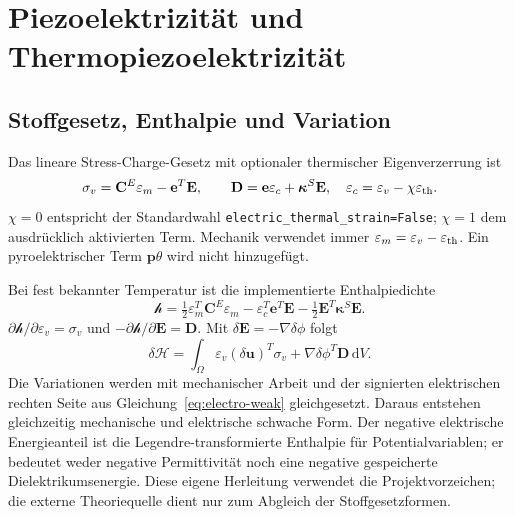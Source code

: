 \chapter{Piezoelektrizität und Thermopiezoelektrizität}\label{chap:coupling}
\section{Stoffgesetz, Enthalpie und Variation}
Das lineare Stress-Charge-Gesetz mit optionaler thermischer Eigenverzerrung ist
\begin{equation}\label{eq:piezo-law}
\sigma_v=\mathbf C^E\varepsilon_m-\mathbf e^T\mathbf E,\qquad
\mathbf D=\mathbf e\varepsilon_c+\boldsymbol\kappa^S\mathbf E,
\quad\varepsilon_c=\varepsilon_v-\chi\varepsilon_{\rm th}.
\end{equation}
$\chi=0$ entspricht der Standardwahl \texttt{electric\_thermal\_strain=False};
$\chi=1$ dem ausdrücklich aktivierten Term. Mechanik verwendet immer
$\varepsilon_m=\varepsilon_v-\varepsilon_{\rm th}$.
Ein pyroelektrischer Term $\mathbf p\theta$ wird nicht hinzugefügt.

Bei fest bekannter Temperatur ist die implementierte Enthalpiedichte
\begin{equation}\label{eq:enthalpy}
\mathcal h=\tfrac12\varepsilon_m^T\mathbf C^E\varepsilon_m
-\varepsilon_c^T\mathbf e^T\mathbf E
-\tfrac12\mathbf E^T\boldsymbol\kappa^S\mathbf E.
\end{equation}
$\partial\mathcal h/\partial\varepsilon_v=\sigma_v$ und
$-\partial\mathcal h/\partial\mathbf E=\mathbf D$.
Mit $\delta\mathbf E=-\nabla\delta\phi$ folgt
\begin{equation}\label{eq:enthalpy-variation}
\delta\mathcal H=\int_\Omega
\varepsilon_v(\delta\mathbf u)^T\sigma_v+
\nabla\delta\phi^T\mathbf D\,\mathrm dV.
\end{equation}
Die Variationen werden mit mechanischer Arbeit und der signierten elektrischen
rechten Seite aus Gleichung~\ref{eq:electro-weak} gleichgesetzt.
Daraus entstehen gleichzeitig mechanische und elektrische schwache Form.
Der negative elektrische Energieanteil ist die Legendre-transformierte
Enthalpie für Potentialvariablen; er bedeutet weder negative Permittivität
noch eine negative gespeicherte Dielektrikumsenergie.
Diese eigene Herleitung verwendet die Projektvorzeichen; die externe
Theoriequelle \cite{comsol-piezo} dient nur zum Abgleich der Stoffgesetzformen.

